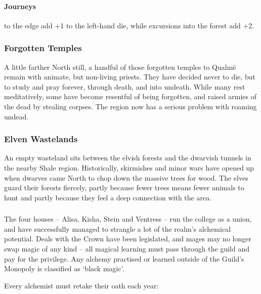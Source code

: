 \begin{multicols}{2}
{  \paragraph{Journeys}
  to the \gls{edge} add +1 to the left-hand die, while excursions into the forest add +2.

}

\subsubsection{Forgotten Temples}

A little farther North still, a handful of those forgotten temples to Qualm\"{e} remain with animate, but non-living priests.
They have decided never to die, but to study and pray forever, through death, and into undeath.
While many rest meditatively, some have become resentful of being forgotten, and raised armies of the dead by stealing corpses.
The region now has a serious problem with roaming undead.

\subsubsection{Elven Wastelands}

An empty wasteland sits between the elvish forests and the dwarvish tunnels in the nearby Shale region.
Historically, skirmishes and minor wars have opened up when dwarves came North to chop down the massive trees for wood.
The elves guard their forests fiercely, partly because fewer trees means fewer animals to hunt and partly because they feel a deep connection with the area.

\subsubsection{}

The four houses -- Alisa, Kisha, Stein and Ventress -- run the college as a union, and have successfully managed to strangle a lot of the realm's alchemical potential.
Deals with the Crown have been legislated, and mages may no longer swap magic of any kind -- all magical learning must pass through the guild and pay for the privilege.
Any alchemy practised or learned outside of the Guild's Monopoly is classified as `black magic'.

Every alchemist must retake their oath each year:

\needspace{3em}
\begin{enumerate}


\end{enumerate}
\end{multicols}
